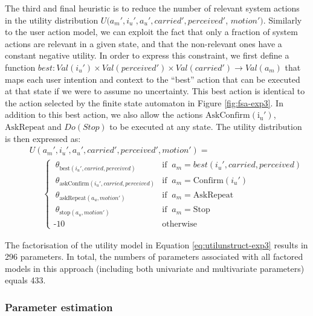The third and final heuristic is to reduce the number of relevant system actions in the utility distribution $U(a_m', i_u', a_u', \mathit{carried}', \mathit{perceived}'$, $\mathit{motion'})$.  Similarly to the user action model, we can exploit the fact that only a fraction of system actions are relevant in a given state, and that the non-relevant ones have a constant negative utility. In order to express this constraint, we first define a function $best: \mathit{Val}(i_u') \times \mathit{Val}(\mathit{perceived}') \times \mathit{Val}(\mathit{carried}') \rightarrow \mathit{Val}(a_m)$ that maps each user intention and context to the ``best'' action that can be executed at that state if we were to assume no uncertainty. This best action is identical to the action selected by the finite state automaton in Figure \ref{fig:fsa-exp3}. In addition to this best action, we also allow the actions $\mathrm{AskConfirm(i_u')}$, $\mathrm{AskRepeat}$ and $Do(Stop)$ to be executed at any state. The utility distribution is then expressed as: 
\begin{align}
&&& U(a_m', i_u', a_u', \mathit{carried}', \mathit{perceived}', \mathit{motion'}) = \nonumber \\
&&& \ \ \ \ \ \ \  \begin{cases} \ \theta_{\text{best}(i_u', \mathit{carried}, \mathit{perceived})} & \text{if } \ a_m = best(i_u', \mathit{carried}, \mathit{perceived}) \\ 
\ \theta_{\text{askConfirm}(i_u', \mathit{carried}, \mathit{perceived})} & \text{if } \ a_m = \mathrm{Confirm}(i_u') \\
\ \theta_{\text{askRepeat}(a_u, \mathit{motion'})} & \text{if } \ a_m = \mathrm{AskRepeat} \\
\ \theta_{\text{stop}(a_u,\mathit{motion'})} & \text{if } \ a_m = \mathrm{Stop} \\ 
\mbox{-}10 & \text{otherwise}
\end{cases} \label{eq:utilunstruct-exp3}
\end{align}

The factorisation of the utility model in Equation \eqref{eq:utilunstruct-exp3} results in 296 parameters. In total, the numbers of parameters associated with all factored models in this approach (including both univariate and multivariate parameters) equals 433.

\subsubsection*{Parameter estimation}

